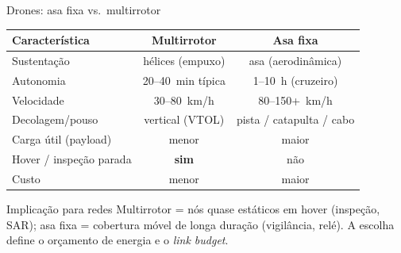 \documentclass[aspectratio=169,11pt]{beamer}
\begin{document}
\begin{frame}{Drones: asa fixa vs.\ multirrotor}
  \begin{center}
    \begin{tabular}{@{}lcc@{}}
      \toprule
      Característica & Multirrotor & Asa fixa\\
      \midrule
      Sustentação & hélices (empuxo) & asa (aerodinâmica) \\
      Autonomia & 20--40~min típica & 1--10~h (cruzeiro) \\
      Velocidade & 30--80~km/h & 80--150+~km/h \\
      Decolagem/pouso & vertical (VTOL) & pista / catapulta / cabo \\
      Carga útil (payload) & menor & maior \\
      Hover / inspeção parada & \textbf{sim} & não \\
      Custo & menor & maior \\
      \bottomrule
    \end{tabular}
  \end{center}
  \pause
  \begin{exampleblock}{Implicação para redes}
    Multirrotor = nós quase estáticos em hover (inspeção, SAR); asa fixa = cobertura móvel de longa duração (vigilância, relé). A escolha define o orçamento de energia e o \emph{link budget}.
  \end{exampleblock}
\end{frame}
\end{document}
